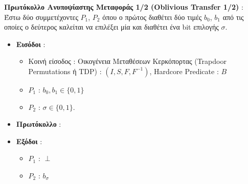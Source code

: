 \begin{definition}
\label{def:oblivious_transfer}
\textbf{Πρωτόκολλο Ανυποψίαστης Μεταφοράς 1/2 (Oblivious Transfer 1/2)} \cite{even1985randomized} :
Έστω δύο συμμετέχοντες $P_1$, $P_2$ όπου ο πρώτος διαθέτει δύο τιμές $b_0$, $b_1$ από τις οποίες ο δεύτερος καλείται να επιλέξει μία και διαθέτει ένα bit επιλογής $σ$.
\begin{mdframed}
\begin{itemize}
\item \textbf{Εισόδοι} : 
    \begin{itemize}
    \item Κοινή είσοδος : Οικογένεια Μεταθέσεων Κερκόπορτας (Trapdoor Permutations ή TDP) : $(I, S, F, F^{-1})$, Hardcore Predicate : $B$
    \item $P_{1}$ : $b_{0}, b_{1} \in\{0,1\}$
    \item $P_{2}$ : $\sigma \in\{0,1\}$.
    \end{itemize}
\item \textbf{Πρωτόκολλο} : \\

\item \textbf{Εξόδοι} :
    \begin{itemize}
        \item $P_1$ : $\perp$
        \item $P_{2}$ : $b_σ$
    \end{itemize}
\end{itemize}
    \end{mdframed}
\end{definition}

